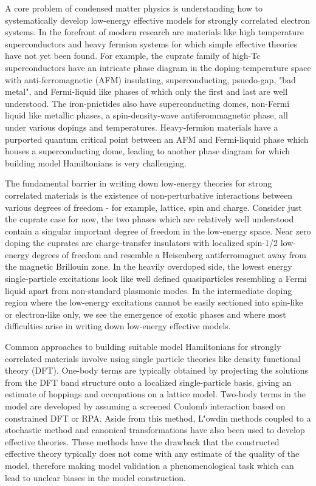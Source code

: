 \documentclass[12pt]{article}
\begin{document}
A core problem of condensed matter physics is understanding how to systematically develop low-energy effective models for strongly correlated electron systems. 
In the forefront of modern research are materials like high temperature superconductors and heavy fermion systems for which simple effective theories have not yet been found. 
For example, the cuprate family of high-Tc superconductors have an intricate phase diagram in the doping-temperature space with anti-ferromagnetic (AFM) insulating, superconducting, psuedo-gap, "bad metal", and Fermi-liquid like phases of which only the first and last are well understood.
The iron-pnictides also have superconducting domes, non-Fermi liquid like metallic phases, a spin-density-wave antiferommagnetic phase, all under various dopings and temperatures. 
Heavy-fermion materials have a purported quantum critical point between an AFM and Fermi-liquid phase which houses a superconducting dome, leading to another phase diagram for which building model Hamiltonians is very challenging. 

The fundamental barrier in writing down low-energy theories for strong correlated materials is the existence of non-perturbative interactions between various degrees of freedom - for example, lattice, spin and charge. 
Consider just the cuprate case for now, the two phases which are relatively well understood contain a singular important degree of freedom in the low-energy space. 
Near zero doping the cuprates are charge-transfer insulators with localized spin-1/2 low-energy degrees of freedom and resemble a Heisenberg antiferromagnet away from the magnetic Brillouin zone. 
In the heavily overdoped side, the lowest energy single-particle excitations look like well defined quasiparticles resembling a Fermi liquid apart from non-standard plasmonic modes. 
In the intermediate doping region where the low-energy excitations cannot be easily sectioned into spin-like or electron-like only, we see the emergence of exotic phases and where most difficulties arise in writing down low-energy effective models. 

Common approaches to building suitable model Hamiltonians for strongly correlated materials involve using single particle theories like density functional theory (DFT).
One-body terms are typically obtained by projecting the solutions from the DFT band structure onto a localized single-particle basis, giving an estimate of hoppings and occupations on a lattice model.
Two-body terms in the model are developed by assuming a screened Coulomb interaction based on constrained DFT or RPA.
Aside from this method, L\''{o}wdin methods coupled to a stochastic method and canonical transformations have also been used to develop effective theories.
These methods have the drawback that the constructed effective theory typically does not come with any estimate of the quality of the model, therefore making model validation a phenomenological task which can lead to unclear biases in the model construction.
\end{document}
